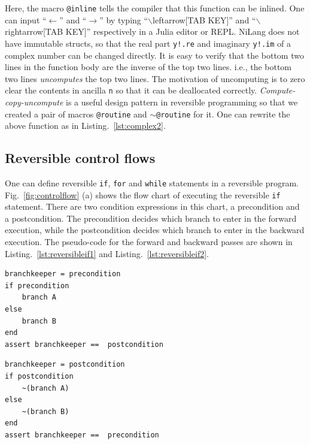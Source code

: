 \documentclass{article}
\newcommand{\<}{\langle}
\renewcommand{\>}{\rangle}
\newcommand{\Fig}[1]{Fig.~\ref{#1}}
\newcommand{\Lst}[1]{Listing.~\ref{#1}}
\theoremstyle{definition}\newtheorem{definition}{\textit{Definition}}
\begin{document}
Here, the macro \texttt{@inline} tells the compiler that this function can be inlined. One can input ``$\leftarrow$'' and ``$\rightarrow$'' by typing ``$\backslash$leftarrow[TAB KEY]'' and ``$\backslash$rightarrow[TAB KEY]'' respectively in a Julia editor or REPL.
NiLang does not have immutable structs, so that the real part \texttt{y!.re} and imaginary \texttt{y!.im} of a complex number can be changed directly.
It is easy to verify that the bottom two lines in the function body are the inverse of the top two lines. i.e., the bottom two lines \textit{uncomputes} the top two lines.
The motivation of uncomputing is to zero clear the contents in ancilla \texttt{n} so that it can be deallocated correctly.
\textit{Compute-copy-uncompute} is a useful design pattern in reversible programming so that we created a pair of macros \texttt{@routine} and \texttt{$\sim$@routine} for it. One can rewrite the above function as in \Lst{lst:complex2}.

\subsection{Reversible control flows}
One can define reversible \texttt{if}, \texttt{for} and \texttt{while} statements in a reversible program.
\Fig{fig:controlflow} (a) shows the flow chart of executing the reversible \texttt{if} statement. There are two condition expressions in this chart, a precondition and a postcondition. The precondition decides which branch to enter in the forward execution, while the postcondition decides which branch to enter in the backward execution. The pseudo-code for the forward and backward passes are shown in \Lst{lst:reversibleif1} and \Lst{lst:reversibleif2}.

\begin{minipage}{.45\columnwidth}
\begin{lstlisting}[mathescape=true,caption={Translating a reversible \texttt{if} statement (forward)},label={lst:reversibleif1}]
branchkeeper = precondition
if precondition
    branch A
else
    branch B
end
assert branchkeeper ==  postcondition
\end{lstlisting}
\end{minipage}
\hfill
\begin{minipage}{.45\columnwidth}
\begin{lstlisting}[mathescape=true,caption={Translating a reversible \texttt{if} statement (backward)},label={lst:reversibleif2}]
branchkeeper = postcondition
if postcondition
    ~(branch A)
else
    ~(branch B)
end
assert branchkeeper ==  precondition
\end{lstlisting}
\end{minipage}
\end{document}
